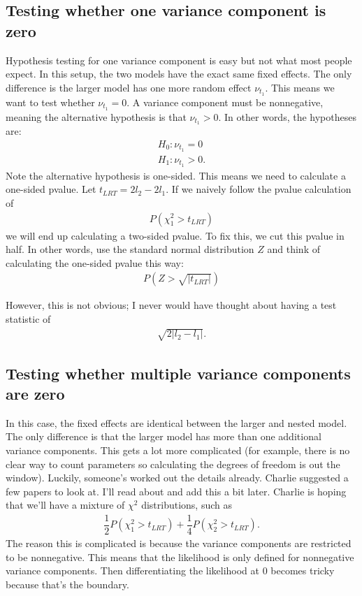 \documentclass{article}
\begin{document}
 
 \subsection{Testing whether one variance component is zero}
  Hypothesis testing for one variance component is easy but not what most people expect.
  In this setup, the two models have the exact same fixed effects. The only difference is the larger model has one more random effect $\nu_{t_1}$. This means we want to test whether $\nu_{t_1}=0$. A variance component must be nonnegative, meaning the alternative hypothesis is that $\nu_{t_1}>0$. In other words, the hypotheses are:
 \begin{align}
 H_0: \nu_{t_1}=0\\
 H_1: \nu_{t_1}>0.
 \end{align}
 Note the alternative hypothesis is one-sided. This means we need to calculate a one-sided pvalue. Let $t_{LRT}=2l_2-2l_1$. If we naively follow the pvalue calculation of
 \begin{align}
P( \chi^2_{1}>t_{LRT})
\end{align}
 we will end up calculating a two-sided pvalue. To fix this, we cut this pvalue in half. In other words, use the standard normal distribution $Z$ and think of calculating the one-sided pvalue this way:
 \begin{align}
 P( Z>\sqrt{|  t_{LRT} |})
 \end{align}
 
 However, this is not obvious; I never would have thought about having a test statistic of
 \begin{align}
 \sqrt{2 | l_2-l_1   |   }.
 \end{align}
 
 \subsection{Testing whether multiple variance components are zero}
 In this case, the fixed effects are identical between the larger and nested model. The only difference is that the larger model has more than one additional variance components. This gets a lot more complicated (for example, there is no clear way to count parameters so calculating the degrees of freedom is out the window). Luckily, someone's worked out the details already. Charlie suggested a few papers to look at. I'll read about and add this a bit later.  Charlie is hoping that we'll have a mixture of $\chi^2$ distributions, such as
 \begin{align}
 \dfrac{1}{2}P (\chi^2_1> t_{LRT}) +\dfrac{1}{4}P (\chi^2_2> t_{LRT}).
 \end{align}
 The reason this is complicated is because the variance components are restricted to be nonnegative. This means that the likelihood is only defined for nonnegative variance components. Then differentiating the likelihood at $0$ becomes tricky because that's the boundary.
\end{document}
